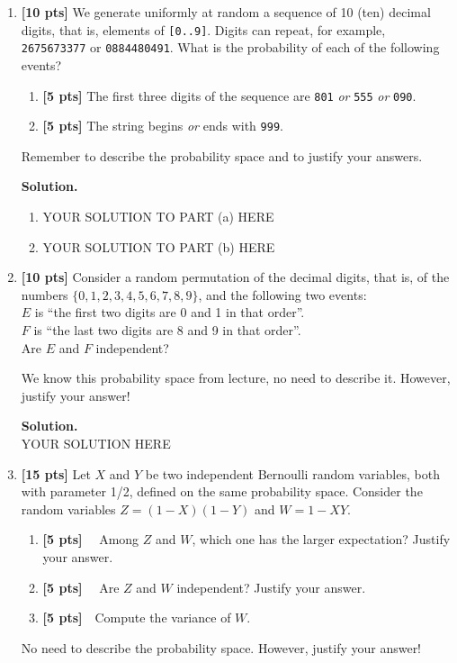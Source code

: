 \documentclass[11pt]{article}
\newcommand{\points}[1]{\textbf{[#1 pts]}}
\begin{document}
\begin{enumerate}
\item \points{10} 
We generate uniformly at random a sequence of 10 (ten) decimal digits, that is, elements of  \texttt{[0..9]}. Digits can repeat, for example, \texttt{2675673377} or \texttt{0884480491}. What is the probability of each of the following events?
\begin{enumerate}
	\item \points{5} The first three digits of the sequence are \texttt{801} \emph{or} \texttt{555} \emph{or} \texttt{090}.
	\item \points{5} The string begins \emph{or} ends with \texttt{999}.
\end{enumerate}
Remember to describe the probability space and to justify your answers.

\textbf{Solution.} 
\begin{enumerate}
    \item YOUR SOLUTION TO PART (a) HERE
    \item YOUR SOLUTION TO PART (b) HERE
\end{enumerate}

\bigskip


\item \points{10} 
Consider a random permutation of the decimal digits, that is, of the numbers $\{0,1,2,3,4,5,6,7,8,9\}$, and the following two events:\\$E$ is ``the first two digits are
0 and 1 in that order''.\\$F$ is ``the last two digits are 8 and 9 in that order''.\\Are $E$ and $F$ independent? 

We know this probability space from lecture, no need to describe it. However, justify your answer!

\textbf{Solution.} \\
YOUR SOLUTION HERE 

\bigskip


\item \points{15} 
Let $X$ and $Y$ be two independent Bernoulli random variables, both with parameter 1/2, defined on the same probability space.
Consider the random variables $Z=(1-X)(1-Y)$ and $W=1-XY$.
\begin{enumerate}
    \item \points{5}~~ Among $Z$ and $W$, which one has the larger expectation? Justify your answer.
    \item \points{5}~~ Are $Z$ and $W$ independent? Justify your answer.
    \item \points{5}~~Compute the variance of $W$.
\end{enumerate}
No need to describe the probability space. However, justify your answer!


\end{enumerate}
\end{document}
